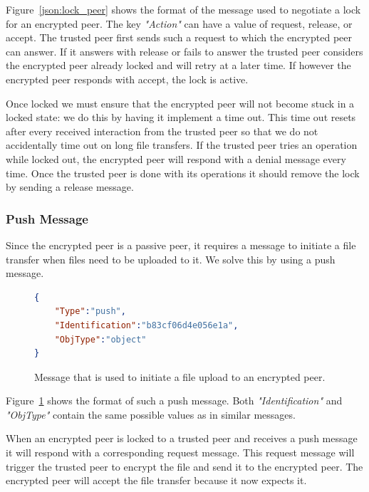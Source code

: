Figure~\ref{json:lock_peer} shows the format of the message used to negotiate a lock for an encrypted peer.
The key \textit{"Action"} can have a value of request, release, or accept.
The trusted peer first sends such a request to which the encrypted peer can answer.
If it answers with release or fails to answer the trusted peer considers the encrypted peer already locked and will retry at a later time.
If however the encrypted peer responds with accept, the lock is active.

Once locked we must ensure that the encrypted peer will not become stuck in a locked state: we do this by having it implement a time out.
This time out resets after every received interaction from the trusted peer so that we do not accidentally time out on long file transfers.
If the trusted peer tries an operation while locked out, the encrypted peer will respond with a denial message every time.
Once the trusted peer is done with its operations it should remove the lock by sending a release message.

\subsubsection{Push Message}
\label{subs:Push Message}

Since the encrypted peer is a passive peer, it requires a message to initiate a file transfer when files need to be uploaded to it.
We solve this by using a push message.

\begin{figure}[htp]
    \begin{lstlisting}[language=json,firstnumber=0]
{
    "Type":"push",
    "Identification":"b83cf06d4e056e1a",
    "ObjType":"object"
}
    \end{lstlisting}
\caption[Push Message]{Message that is used to initiate a file upload to an encrypted peer.}
\label{json:push_message}
\end{figure}

Figure~\ref{json:push_message} shows the format of such a push message.
Both \textit{"Identification"} and \textit{"ObjType"} contain the same possible values as in similar messages.

When an encrypted peer is locked to a trusted peer and receives a push message it will respond with a corresponding request message.
This request message will trigger the trusted peer to encrypt the file and send it to the encrypted peer.
The encrypted peer will accept the file transfer because it now expects it.

